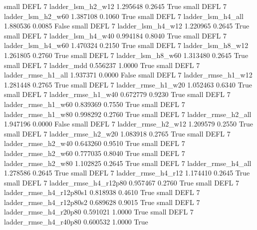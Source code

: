      small     DEFL                 7        ladder_lsm_h2_w12   1.295648      0.2645    True
     small     DEFL                 7        ladder_lsm_h2_w60   1.387108      0.1060    True
     small     DEFL                 7        ladder_lsm_h4_all   1.880536      0.0085   False
     small     DEFL                 7        ladder_lsm_h4_w12   1.220965      0.2645    True
     small     DEFL                 7        ladder_lsm_h4_w40   0.994184      0.8040    True
     small     DEFL                 7        ladder_lsm_h4_w60   1.470324      0.2150    True
     small     DEFL                 7        ladder_lsm_h8_w12   1.261805      0.2760    True
     small     DEFL                 7        ladder_lsm_h8_w60   1.313480      0.2645    True
     small     DEFL                 7               ladder_mdd   0.556237      1.0000    True
     small     DEFL                 7       ladder_rmse_h1_all   1.937371      0.0000   False
     small     DEFL                 7       ladder_rmse_h1_w12   1.281448      0.2765    True
     small     DEFL                 7       ladder_rmse_h1_w20   1.052463      0.6340    True
     small     DEFL                 7       ladder_rmse_h1_w40   0.672779      0.9230    True
     small     DEFL                 7       ladder_rmse_h1_w60   0.839369      0.7550    True
     small     DEFL                 7       ladder_rmse_h1_w80   0.998292      0.2760    True
     small     DEFL                 7       ladder_rmse_h2_all   1.947196      0.0000   False
     small     DEFL                 7       ladder_rmse_h2_w12   1.209579      0.2550    True
     small     DEFL                 7       ladder_rmse_h2_w20   1.083918      0.2765    True
     small     DEFL                 7       ladder_rmse_h2_w40   0.643260      0.9510    True
     small     DEFL                 7       ladder_rmse_h2_w60   0.777035      0.8040    True
     small     DEFL                 7       ladder_rmse_h2_w80   1.102825      0.2645    True
     small     DEFL                 7       ladder_rmse_h4_all   1.278586      0.2645    True
     small     DEFL                 7       ladder_rmse_h4_r12   1.174410      0.2645    True
     small     DEFL                 7    ladder_rmse_h4_r12p80   0.957467      0.2760    True
     small     DEFL                 7  ladder_rmse_h4_r12p80s1   0.818938      0.4610    True
     small     DEFL                 7  ladder_rmse_h4_r12p80s2   0.689628      0.9015    True
     small     DEFL                 7    ladder_rmse_h4_r20p80   0.591021      1.0000    True
     small     DEFL                 7    ladder_rmse_h4_r40p80   0.600532      1.0000    True
